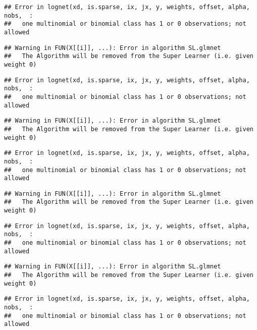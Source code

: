 \documentclass[
]{article}
\begin{document}
\begin{verbatim}
## Error in lognet(xd, is.sparse, ix, jx, y, weights, offset, alpha, nobs,  : 
##   one multinomial or binomial class has 1 or 0 observations; not allowed
\end{verbatim}

\begin{verbatim}
## Warning in FUN(X[[i]], ...): Error in algorithm SL.glmnet 
##   The Algorithm will be removed from the Super Learner (i.e. given weight 0)
\end{verbatim}

\begin{verbatim}
## Error in lognet(xd, is.sparse, ix, jx, y, weights, offset, alpha, nobs,  : 
##   one multinomial or binomial class has 1 or 0 observations; not allowed
\end{verbatim}

\begin{verbatim}
## Warning in FUN(X[[i]], ...): Error in algorithm SL.glmnet 
##   The Algorithm will be removed from the Super Learner (i.e. given weight 0)
\end{verbatim}

\begin{verbatim}
## Error in lognet(xd, is.sparse, ix, jx, y, weights, offset, alpha, nobs,  : 
##   one multinomial or binomial class has 1 or 0 observations; not allowed
\end{verbatim}

\begin{verbatim}
## Warning in FUN(X[[i]], ...): Error in algorithm SL.glmnet 
##   The Algorithm will be removed from the Super Learner (i.e. given weight 0)
\end{verbatim}

\begin{verbatim}
## Error in lognet(xd, is.sparse, ix, jx, y, weights, offset, alpha, nobs,  : 
##   one multinomial or binomial class has 1 or 0 observations; not allowed
\end{verbatim}

\begin{verbatim}
## Warning in FUN(X[[i]], ...): Error in algorithm SL.glmnet 
##   The Algorithm will be removed from the Super Learner (i.e. given weight 0)
\end{verbatim}

\begin{verbatim}
## Error in lognet(xd, is.sparse, ix, jx, y, weights, offset, alpha, nobs,  : 
##   one multinomial or binomial class has 1 or 0 observations; not allowed
\end{verbatim}
\end{document}
